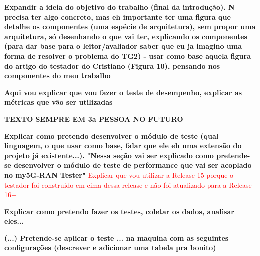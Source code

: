 \textbf{Expandir a ideia do objetivo do trabalho (final da introdução). N precisa ter algo concreto, mas eh importante ter uma figura que detalhe os componentes (uma espécie de arquitetura), sem propor uma arquitetura, só desenhando o que vai ter, explicando os componentes (para dar base para o leitor/avaliador saber que eu ja imagino uma forma de resolver o problema do TG2) - usar como base aquela figura do artigo do testador do Cristiano (Figura 10), pensando nos componentes do meu trabalho}



\textbf{Aqui vou explicar que vou fazer o teste de desempenho, explicar as métricas que vão ser utilizadas}

\textbf{TEXTO SEMPRE EM 3a PESSOA NO FUTURO}

\textbf{Explicar como pretendo desenvolver o módulo de teste (qual linguagem, o que usar como base, falar que ele eh uma extensão do projeto já existente...).}
\textbf{"Nessa seção vai ser explicado como pretende-se desenvolver o módulo de teste de performance que vai ser acoplado no my5G-RAN Tester"}
\textcolor{red}{Explicar que vou utilizar a Release 15 porque o testador foi construido em cima dessa release e não foi atualizado para a Release 16+}

\textbf{Explicar como pretendo fazer os testes, coletar os dados, analisar eles...}

\textbf{(...) Pretende-se aplicar o teste ... na maquina com as seguintes configurações (descrever e adicionar uma tabela pra bonito)}

